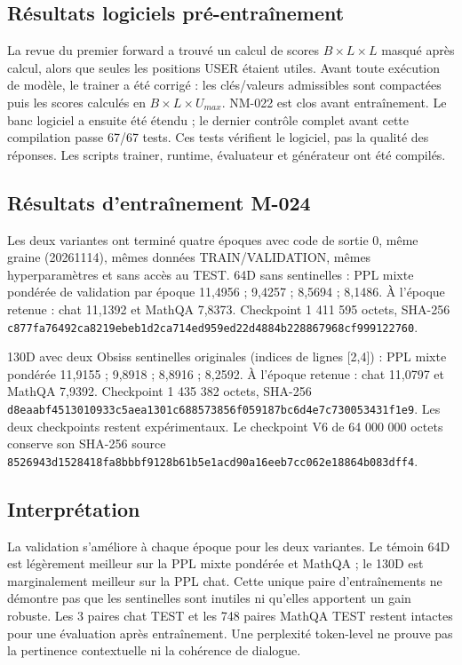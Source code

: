 \documentclass[11pt,a4paper]{report}
\begin{document}
\subsection*{Résultats logiciels pré-entraînement}
La revue du premier forward a trouvé un calcul de scores $B\times L\times L$ masqué après calcul, alors que seules les positions USER étaient utiles. Avant toute exécution de modèle, le trainer a été corrigé : les clés/valeurs admissibles sont compactées puis les scores calculés en $B\times L\times U_{max}$. NM-022 est clos avant entraînement. Le banc logiciel a ensuite été étendu ; le dernier contrôle complet avant cette compilation passe 67/67 tests. Ces tests vérifient le logiciel, pas la qualité des réponses. Les scripts trainer, runtime, évaluateur et générateur ont été compilés.

\subsection*{Résultats d'entraînement M-024}
Les deux variantes ont terminé quatre époques avec code de sortie 0, même graine (20261114), mêmes données TRAIN/VALIDATION, mêmes hyperparamètres et sans accès au TEST. 64D sans sentinelles : PPL mixte pondérée de validation par époque 11,4956 ; 9,4257 ; 8,5694 ; 8,1486. À l'époque retenue : chat 11,1392 et MathQA 7,8373. Checkpoint 1 411 595 octets, SHA-256 \texttt{c877fa76492ca8219ebeb1d2ca714ed959ed22d4884b228867968cf999122760}.

130D avec deux Obsiss sentinelles originales (indices de lignes [2,4]) : PPL mixte pondérée 11,9155 ; 9,8918 ; 8,8916 ; 8,2592. À l'époque retenue : chat 11,0797 et MathQA 7,9392. Checkpoint 1 435 382 octets, SHA-256 \texttt{d8eaabf4513010933c5aea1301c688573856f059187bc6d4e7c730053431f1e9}. Les deux checkpoints restent expérimentaux. Le checkpoint V6 de 64 000 000 octets conserve son SHA-256 source \texttt{8526943d1528418fa8bbbf9128b61b5e1acd90a16eeb7cc062e18864b083dff4}.

\subsection*{Interprétation}
La validation s'améliore à chaque époque pour les deux variantes. Le témoin 64D est légèrement meilleur sur la PPL mixte pondérée et MathQA ; le 130D est marginalement meilleur sur la PPL chat. Cette unique paire d'entraînements ne démontre pas que les sentinelles sont inutiles ni qu'elles apportent un gain robuste. Les 3 paires chat TEST et les 748 paires MathQA TEST restent intactes pour une évaluation après entraînement. Une perplexité token-level ne prouve pas la pertinence contextuelle ni la cohérence de dialogue.
\end{document}

